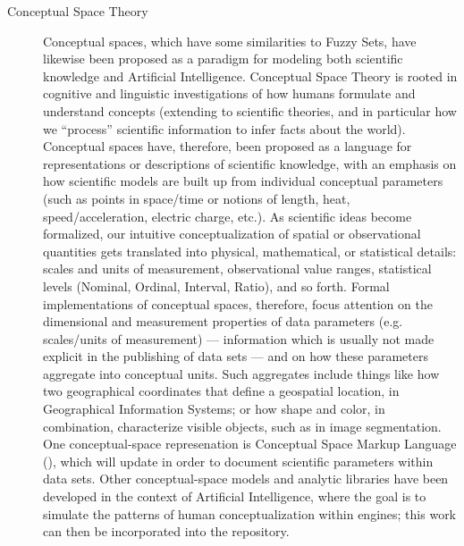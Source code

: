 \documentclass[11pt,letterpaper]{article}
\newcommand{\ATextCClr}[1]{\textcolor{atcColor}{\textbf{#1}}}
\newcommand{\AIMConc}{\resizebox{!}{7.5pt}{\ATextCClr{AIM-Concepts}}}
\newcommand{\CRtwo}{{\resizebox{!}{7.5pt}{\ATextCClr{CR2}}}}
\newcommand{\CSML}{\resizebox{!}{7pt}{\AcronymText{CSML}}}
\newcommand{\AI}{\resizebox{!}{7.5pt}{\AcronymText{AI}}}
\newcommand{\textscc}[1]{{\color{orr!35!black}{{%
						\fontfamily{Cabin-TLF}\fontseries{b}\selectfont{\textsc{\scriptsize{#1}}}}}}}
\newcommand{\AcronymText}[1]{{\textscc{#1}}}
\newcommand{\q}[1]{{\fontfamily{qcr}\selectfont ``}#1{\fontfamily{qcr}\selectfont ''}}
\begin{document}
{{\begin{description}
\item[Conceptual Space Theory]  Conceptual spaces, 
which have some similarities to Fuzzy Sets, 
have likewise been proposed as a paradigm 
for modeling both scientific knowledge and Artificial 
Intelligence.  Conceptual Space Theory is 
rooted in cognitive and linguistic investigations 
of how humans formulate and understand concepts 
(extending to scientific theories, and in particular 
how we \q{process} scientific information to infer 
facts about the world).  Conceptual spaces have, therefore, 
been proposed as a language for representations or descriptions 
of scientific knowledge, with an emphasis on how 
scientific models are built up from individual 
conceptual parameters (such as points in space/time 
or notions of length, heat, speed/acceleration, electric 
charge, etc.).  As scientific ideas become formalized, 
our intuitive conceptualization of spatial or observational 
quantities gets translated into physical, mathematical, or 
statistical details: scales and units of measurement, 
observational value ranges, statistical levels 
(Nominal, Ordinal, Interval, Ratio), and so forth.  
Formal implementations of conceptual spaces, therefore, 
focus attention on the dimensional and measurement 
properties of data parameters (e.g. scales/units of measurement) 
--- information which is usually not made explicit in the 
publishing of data sets --- and on how these parameters aggregate into 
conceptual units.  Such aggregates include things like how two 
geographical coordinates that define a 
geospatial location, in Geographical Information Systems; 
or how shape and color, in combination, characterize 
visible objects, such as in image segmentation.  One conceptual-space represenation 
is Conceptual Space Markup Language (\CSML{}), which 
\CRtwo{} will update in order to document scientific parameters 
within data sets.  Other conceptual-space models and 
analytic libraries have been developed in the context 
of Artificial Intelligence, where the goal is to 
simulate the patterns of human conceptualization within 
\AI{} engines; this work can then be incorporated into 
the \AIMConc{} repository.
   

\end{description}}}
\end{document}
